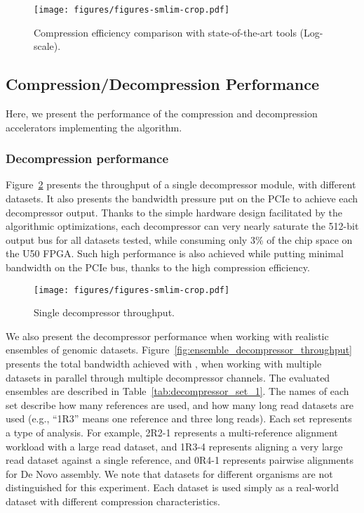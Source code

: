 \begin{figure}[htb]
    \centering
    \texttt{[image: figures/figures-smlim-crop.pdf]}
    \caption{Compression efficiency comparison with state-of-the-art tools (Log-scale).}
    \label{fig:compression_efficiency_comparison}
\end{figure}


\subsection{Compression/Decompression Performance}
\label{sec:compression_performance}

Here, we present the performance of the compression and decompression accelerators implementing the \name{} algorithm.

\subsubsection{Decompression performance}
Figure~\ref{fig:single_decompressor_throughput} presents the throughput of a single decompressor module, with different datasets.
It also presents the bandwidth pressure put on the PCIe to achieve each decompressor output.
Thanks to the simple hardware design facilitated by the algorithmic optimizations, each decompressor can very nearly saturate the 512-bit output bus for all datasets tested, while consuming only 3\% of the chip space on the U50 FPGA.
Such high performance is also achieved while putting minimal bandwidth on the PCIe bus, thanks to the high compression efficiency.

\begin{figure}[htb]
    \centering
    \texttt{[image: figures/figures-smlim-crop.pdf]}
    \caption{Single decompressor throughput.}
    \label{fig:single_decompressor_throughput}
\end{figure}

We also present the decompressor performance when working with realistic ensembles of genomic datasets.
Figure~\ref{fig:ensemble_decompressor_throughput} presents the total bandwidth achieved with \name{}, when working with multiple datasets in parallel through multiple decompressor channels.
The evaluated ensembles are described in Table~\ref{tab:decompressor_set_1}.
The names of each set describe how many references are used, and how many long read datasets are used (e.g., ``1R3'' means one reference and three long reads).
Each set represents a type of analysis.
For example, 2R2-1 represents a multi-reference alignment workload with a large read dataset, and 1R3-4 represents aligning a very large read dataset against a single reference, and 0R4-1 represents pairwise alignments for De Novo assembly.
We note that datasets for different organisms are not distinguished for this experiment.
Each dataset is used simply as a real-world dataset with different compression characteristics.

